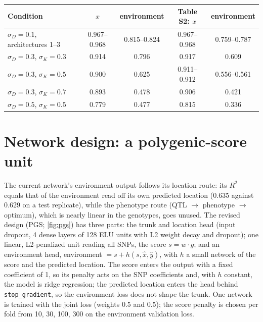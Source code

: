 \begin{center}
\begin{tabular}{lcccc}
\toprule
Condition & $x$ & environment & Table S2: $x$ & environment \\
\midrule
$\sigma_D=0.1$, architectures 1--3 & 0.967--0.968 & 0.815--0.824 & 0.967--0.968 & 0.759--0.787 \\
$\sigma_D=0.3$, $\sigma_K=0.3$ & 0.914 & 0.796 & 0.917 & 0.609 \\
$\sigma_D=0.3$, $\sigma_K=0.5$ & 0.900 & 0.625 & 0.911--0.912 & 0.556--0.561 \\
$\sigma_D=0.3$, $\sigma_K=0.7$ & 0.893 & 0.478 & 0.906 & 0.421 \\
$\sigma_D=0.5$, $\sigma_K=0.5$ & 0.779 & 0.477 & 0.815 & 0.336 \\
\bottomrule
\end{tabular}
\end{center}



\section{Network design: a polygenic-score unit}
\label{sec:pgs}

The current network's environment output follows its location route: its
$R^2$ equals that of the environment read off its own predicted location
(0.635 against 0.629 on a test replicate), while the phenotype route
(QTL $\to$ phenotype $\to$ optimum), which is nearly linear in the
genotypes, goes unused. The revised design (PGS; \cref{fig:pgs}) has three parts: the
trunk and location head (input dropout, 4 dense layers of 128 ELU units
with L2 weight decay and dropout); one linear, L2-penalized unit reading
all SNPs, the score $s = w \cdot g$; and an environment head,
environment $= s + h(s, \hat{x}, \hat{y})$, with $h$ a small network of
the score and the predicted location. The score enters the output with a
fixed coefficient of 1, so its penalty acts on the SNP coefficients and,
with $h$ constant, the model is ridge regression; the predicted location
enters the head behind \texttt{stop\_gradient}, so the environment loss
does not shape the trunk. One network is trained with the joint loss
(weights 0.5 and 0.5); the score penalty is chosen per fold from 10, 30,
100, 300 on the environment validation loss.

